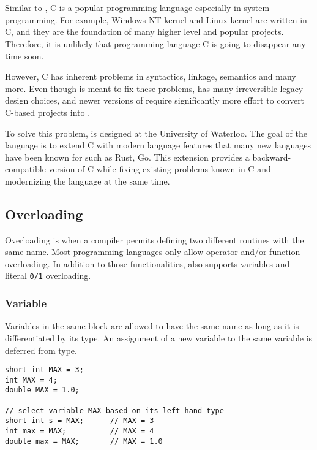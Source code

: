 \chapter{\CFA} \label{CFA}
Similar to \CC, C is a popular programming language especially in system
programming. For example, Windows NT kernel and Linux kernel are written in C, and they are the foundation of many higher level
and popular projects. Therefore, it is unlikely that programming language C is
going to disappear any time soon.

However, C has inherent problems in syntactics, linkage, semantics and many
more\cite{reference2}. Even though \CCS is meant to fix these problems, \CCS has many
irreversible legacy design choices, and newer versions of \CCS require significantly more effort to convert C-based projects into \CCS.

To solve this problem, \CFAS is designed at the University of Waterloo. The goal
of the language is to extend C with modern language features that many new
languages have been known for such as Rust, Go. This extension provides a
backward-compatible version of C while fixing existing problems known in C and
modernizing the language at the same time.

\section{Overloading}
Overloading is when a compiler permits defining two different routines with
the same name. Most programming languages only allow operator and/or function overloading.
In addition to those functionalities, \CFAS also supports variables and literal
\verb|0/1| overloading.

\subsection{Variable}
Variables in the same block are allowed to have the same name as long as it is
differentiated by its type. An assignment of a new variable to the same variable is
deferred from type.


\begin{lstlisting}[caption={Overloading variables in \CFA}, label={CFA-overload-var}]
short int MAX = 3;
int MAX = 4;
double MAX = 1.0;

// select variable MAX based on its left-hand type
short int s = MAX;      // MAX = 3
int max = MAX;          // MAX = 4
double max = MAX;       // MAX = 1.0
\end{lstlisting}

